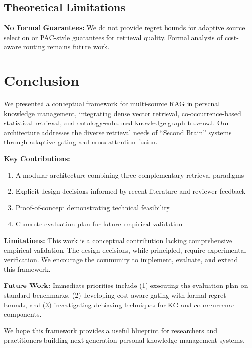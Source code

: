\documentclass[11pt,a4paper]{article}
\begin{document}
\subsection{Theoretical Limitations}

\textbf{No Formal Guarantees:} We do not provide regret bounds for adaptive source selection or PAC-style guarantees for retrieval quality. Formal analysis of cost-aware routing remains future work.

\section{Conclusion}
\label{sec:conclusion}

We presented a conceptual framework for multi-source RAG in personal knowledge management, integrating dense vector retrieval, co-occurrence-based statistical retrieval, and ontology-enhanced knowledge graph traversal. Our architecture addresses the diverse retrieval needs of ``Second Brain'' systems through adaptive gating and cross-attention fusion.

\textbf{Key Contributions:}
\begin{enumerate}
    \item A modular architecture combining three complementary retrieval paradigms
    \item Explicit design decisions informed by recent literature and reviewer feedback
    \item Proof-of-concept demonstrating technical feasibility
    \item Concrete evaluation plan for future empirical validation
\end{enumerate}

\textbf{Limitations:} This work is a conceptual contribution lacking comprehensive empirical validation. The design decisions, while principled, require experimental verification. We encourage the community to implement, evaluate, and extend this framework.

\textbf{Future Work:} Immediate priorities include (1) executing the evaluation plan on standard benchmarks, (2) developing cost-aware gating with formal regret bounds, and (3) investigating debiasing techniques for KG and co-occurrence components.

We hope this framework provides a useful blueprint for researchers and practitioners building next-generation personal knowledge management systems.
\end{document}
